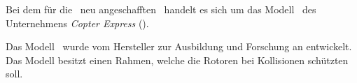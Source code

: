 
Bei dem für die \DHBW\ neu angeschafften \Quad\ handelt es sich um das Modell \Clover\ des Unternehmens \textit{Copter Express} (\COEX).

Das Modell \Clover\ wurde vom Hersteller zur Ausbildung und Forschung an \Quad[n] entwickelt. Das Modell besitzt einen Rahmen, welche die Rotoren bei Kollisionen schützten soll.


